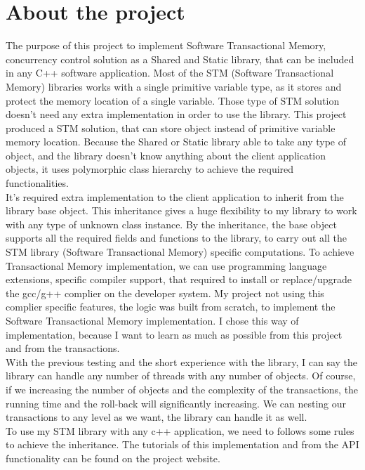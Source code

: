 \documentclass[12pt]{article}
\begin{document}
  
\section{About the project}
The purpose of this project to implement Software Transactional Memory, concurrency control solution as a Shared and Static library, that can be included in any C++ software application. Most of the STM (Software Transactional Memory) libraries works with a single primitive variable type, as it stores and protect the memory location of a single variable. Those type of STM solution doesn't need any extra implementation in order to use the library. This project produced a STM solution, that can store object instead of primitive variable memory location. Because the Shared or Static library able to take any type of object, and the library doesn't know anything about the client application objects, it uses polymorphic class hierarchy to achieve the required functionalities.\\

It's required extra implementation to the client application to inherit from the library base object. This inheritance gives a huge flexibility to my library to work with any type of unknown class instance. By the inheritance, the base object supports all the required fields and functions to the library, to carry out all the STM library (Software Transactional Memory) specific computations. To achieve Transactional Memory implementation, we can use programming language extensions, specific compiler support, that required to install or replace/upgrade the gcc/g++ complier on the developer system. My project not using this complier specific features, the logic was built from scratch, to implement the Software Transactional Memory implementation. I chose this way of implementation, because I want to learn as much as possible from this project and from the transactions.\\
 
With the previous testing and the short experience with the library, I can say the library can handle any number of threads with any number of objects. Of course, if we increasing the number of objects and the complexity of the transactions, the running time and the roll-back will significantly increasing. We can nesting our transactions to any level as we want, the library can handle it as well.\\

To use my STM library with any c++ application, we need to follows some rules to achieve the inheritance. The tutorials of this implementation and from the API functionality can be found on the project website.
\end{document}
